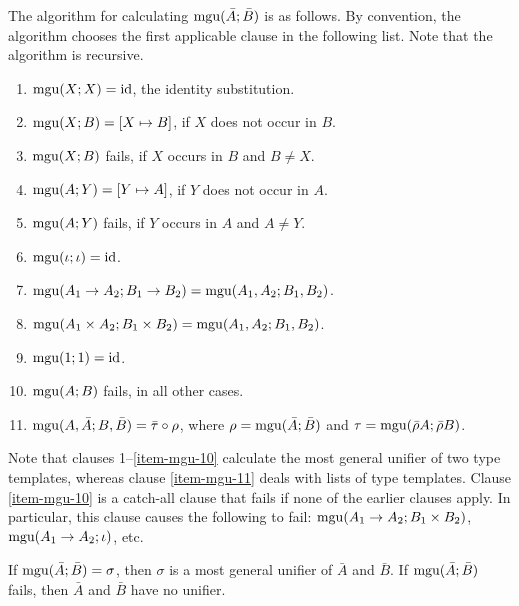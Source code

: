 \documentclass{article}
\begin{document}
The algorithm for calculating $\mathop{\rm mgu}(\bar{A};\bar{B})$ is as follows.
By convention, the algorithm chooses the first applicable clause in the
following list. Note that the algorithm is recursive.

\begin{enumerate}
\item $\mathop{\rm mgu}(X;X)={\rm id}$, the identity substitution.
\item\label{item-mgu-2} $\mathop{\rm mgu}(X;B)=[X\mapsto B]$, if $X$ does
  not occur in $B$.
\item $\mathop{\rm mgu}(X;B)$ fails, if $X$ occurs in $B$ and $B\neq X$.
\item $\mathop{\rm mgu}(A;Y)=[Y\mapsto A]$, if $Y$ does not occur in $A$.
\item $\mathop{\rm mgu}(A;Y)$ fails, if $Y$ occurs in $A$ and $A\neq Y$.
\item $\mathop{\rm mgu}(\iota;\iota)={\rm id}$.
\item $\mathop{\rm mgu}(A_1\to A_2; B_1\to B_2) = \mathop{\rm mgu}(A_1,A_2; B_1,B_2)$.
\item $\mathop{\rm mgu}(A_1\times A_2; B_1\times B_2) = \mathop{\rm mgu}(A_1,A_2; B_1,B_2)$.
\item $\mathop{\rm mgu}(1; 1) = {\rm id}$.
\item\label{item-mgu-10} $\mathop{\rm mgu}(A; B)$ fails, in all other cases.
\item\label{item-mgu-11} $\mathop{\rm mgu}(A,\bar{A};B,\bar{B}) = \bar{\tau} \circ
  \rho$, where $\rho=\mathop{\rm mgu}(\bar{A};\bar{B})$ and $\tau=\mathop{\rm mgu}(\bar{\rho}
  A;\bar{\rho} B)$.
\end{enumerate}

Note that clauses 1--\ref{item-mgu-10} calculate the most general
unifier of two type templates, whereas clause {\ref{item-mgu-11}}
deals with lists of type templates. Clause {\ref{item-mgu-10}} is a
catch-all clause that fails if none of the earlier clauses apply.  In
particular, this clause causes the following to fail: $\mathop{\rm mgu}(A_1\to
A_2; B_1\times B_2)$, $\mathop{\rm mgu}(A_1\to A_2; \iota)$, etc.

\begin{proposition}\label{pro-unification}
  If $\mathop{\rm mgu}(\bar{A};\bar{B})=\sigma$, then $\sigma$ is a most general
  unifier of $\bar{A}$ and $\bar{B}$. If $\mathop{\rm mgu}(\bar{A};\bar{B})$
  fails, then $\bar{A}$ and $\bar{B}$ have no unifier. 
\end{proposition}
\end{document}
